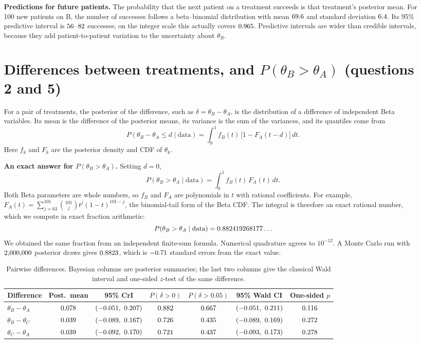 \documentclass[11pt,a4paper]{article}
\newcommand{\tA}{\theta_A}
\newcommand{\tB}{\theta_B}
\newcommand{\tC}{\theta_C}
\begin{document}
\textbf{Predictions for future patients.} The probability that the next patient on a treatment
succeeds is that treatment's posterior mean. For 100 new patients on B, the number of successes
follows a beta--binomial distribution with mean $69.6$ and standard deviation $6.4$.
Its 95\% predictive interval is $56$--$82$ successes; on the integer scale this
actually covers $0.965$. Predictive intervals are wider than credible intervals, because they
add patient-to-patient variation to the uncertainty about $\tB$.

\section{\texorpdfstring{Differences between treatments, and $P(\tB>\tA)$ (questions 2 and 5)}{Differences between treatments, and P(B > A) (questions 2 and 5)}}

For a pair of treatments, the posterior of the difference, such as $\delta=\tB-\tA$, is the
distribution of a difference of independent Beta variables. Its mean is the difference of the
posterior means, its variance is the sum of the variances, and its quantiles come from
\[
P(\tB-\tA\le d\mid\text{data})=\int_0^1 f_B(t)\,\bigl[1-F_A(t-d)\bigr]\,dt .
\]
Here $f_k$ and $F_k$ are the posterior density and CDF of $\theta_k$.

\textbf{An exact answer for $P(\tB>\tA)$.} Setting $d=0$,
\[
P(\tB>\tA\mid\text{data})=\int_0^1 f_B(t)\,F_A(t)\,dt .
\]
Both Beta parameters are whole numbers, so $f_B$ and $F_A$ are polynomials in $t$ with rational
coefficients. For example, $F_A(t)=\sum_{j=63}^{101}\binom{101}{j}t^j(1-t)^{101-j}$, the binomial-tail
form of the Beta CDF. The integral is therefore an exact rational number, which we compute in
exact fraction arithmetic:
\[
P(\tB>\tA\mid\text{data})=\pgtlongBA\ldots
\]
We obtained the same fraction from an independent finite-sum formula. Numerical quadrature agrees
to $10^{-12}$. A Monte Carlo run with $2{,}000{,}000$ posterior draws gives $0.8823$, which is
$-0.71$ standard errors from the exact value.

\begin{table}[H]
\centering\small
\caption{Pairwise differences. Bayesian columns are posterior summaries; the last two columns
give the classical Wald interval and one-sided $z$-test of the same difference.}\label{tab:diff}
\begin{tabular}{lcccccc}
\toprule
Difference & Post.\ mean & 95\% CrI & $P(\delta>0)$ & $P(\delta>0.05)$ & 95\% Wald CI & One-sided $p$\\
\midrule
$\tB-\tA$ & $0.078$ & $(\dloBA,\ \dhiBA)$ & $0.882$ & $0.667$ & $(\cwaldloBA,\ \cwaldhiBA)$ & $0.116$\\
$\tB-\tC$ & $0.039$ & $(\dloBC,\ \dhiBC)$ & $0.726$ & $0.435$ & $(\cwaldloBC,\ \cwaldhiBC)$ & $0.272$\\
$\tC-\tA$ & $0.039$ & $(\dloCA,\ \dhiCA)$ & $0.721$ & $0.437$ & $(\cwaldloCA,\ \cwaldhiCA)$ & $0.278$\\
\bottomrule
\end{tabular}
\end{table}
\end{document}
